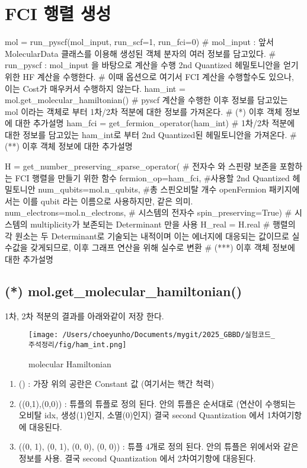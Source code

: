 \documentclass[11pt]{article}
\begin{document}
\section{FCI 행렬 생성}
\begin{CodeBox}[title={Example: Python snippet}]
mol = run_pyscf(mol_input, run_scf=1, run_fci=0)
# mol_input : 앞서 MolecularData 클래스를 이용해 생성된 객체 분자의 여러 정보를 담고있다. 
# run_pyscf : mol_input 을 바탕으로 계산을 수행 2nd Quantized 헤밀토니안을 얻기위한 HF 계산을 수행한다. 
# 이때 옵션으로 여기서 FCI 계산을 수행할수도 있으나, 이는 Cost가 매우커서 수행하지 않는다. 
ham_int = mol.get_molecular_hamiltonian()
# pyscf 계산을 수행한 이후 정보를 담고있는 mol 이라는 객체로 부터 1차/2차 적분에 대한 정보를 가져온다. 
# (*) 이후 객체 정보에 대한 추가설명
ham_fci = get_fermion_operator(ham_int)
# 1차/2차 적분에 대한 정보를 담고있는 ham_int로 부터 2nd Quantized된 헤밀토니안을 가져온다. 
# (**) 이후 객체 정보에 대한 추가설명 

H = get_number_preserving_sparse_operator(
# 전자수 와 스핀량 보존을 포함하는 FCI 행렬을 만들기 위한 함수
fermion_op=ham_fci, #사용할 2nd Quantized 헤밀토니안
num_qubits=mol.n_qubits, #총 스핀오비탈 개수 openFermion 패키지에서는 이를 qubit 라는 이름으로 사용하지만, 같은 의미.
num_electrons=mol.n_electrons,  # 시스템의 전자수 
spin_preserving=True)        # 시스템의 multiplicity가 보존되는 Determinant 만을 사용
H_real = H.real # 행렬의 각 원소는 두 Determinant로 기술되는 내적이며 이는 에너지에 대응되는 값이므로 실수값을 갖게되므로, 이후 그래프 연산을 위해 실수로 변환
# (***) 이후 객체 정보에 대한 추가설명 
\end{CodeBox}
\newpage
\subsection{(*) mol.get\_molecular\_hamiltonian()}
1차, 2차 적분의 결과를 아래와같이 저장 한다. 
\begin{figure}[H]
    \centering
    \texttt{[image: /Users/choeyunho/Documents/mygit/2025\_GBBD/실험코드\_주석정리/fig/ham\_int.png]}
    \caption{molecular Hamiltonian}
    \label{fig:my_image}
\end{figure}
\begin{enumerate}[label=\textbf{*}, leftmargin=*]
  \item () : 가장 위의 공란은 Constant 값 (여기서는 핵간 척력) 
  \item ((0,1),(0,0)) : 튜플의 튜플로 정의 된다. 안의 튜플은 순서대로 (연산이 수행되는 오비탈 idx, 생성(1)인지, 소멸(0)인지) 결국 second Quantization 에서 1차여기항에 대응된다. 
  \item ((0, 1), (0, 1), (0, 0), (0, 0)) : 튜플 4개로 정의 된다. 안의 튜플은 위에서와 같은 정보를 사용. 결국 second Quantization 에서 2차여기항에 대응된다. 
\end{enumerate}
\end{document}
